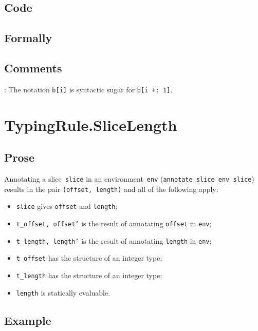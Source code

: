 \documentclass{book}
\begin{document}
  \subsection{Code}

\begin{emptyformal}
    \subsection{Formally}
\end{emptyformal}

\subsection{Comments}
    : The notation \texttt{b[i]} is syntactic sugar for \texttt{b[i +: 1]}.

\section{TypingRule.SliceLength \label{sec:TypingRule.SliceLength}}

  \subsection{Prose}
   Annotating a slice~\texttt{slice} in an environment~\texttt{env}
(\texttt{annotate\_slice env slice}) results in the pair \texttt{(offset,
length)} and all of the following apply:
   \begin{itemize}
   \item \texttt{slice} gives \texttt{offset} and \texttt{length};
   \item \texttt{t\_offset, offset'} is the result of annotating \texttt{offset} in \texttt{env};
   \item \texttt{t\_length, length'} is the result of annotating \texttt{length} in \texttt{env};
   \item \texttt{t\_offset} has the structure of an integer type;
   \item \texttt{t\_length} has the structure of an integer type;
   \item \texttt{length} is statically evaluable.
   \end{itemize}

  \subsection{Example}
\end{document}
